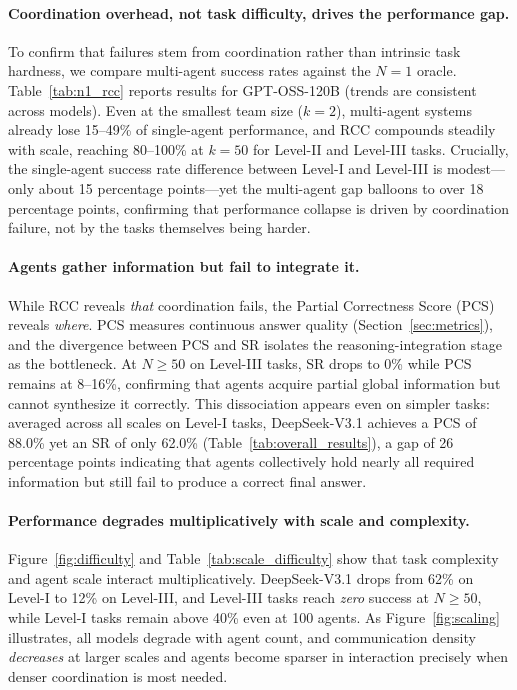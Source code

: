 \paragraph{Coordination overhead, not task difficulty, drives the performance gap.}
To confirm that failures stem from coordination rather than intrinsic task hardness, we compare multi-agent success rates against the $N{=}1$ oracle. 
Table~\ref{tab:n1_rcc} reports results for GPT-OSS-120B (trends are consistent across models). 
Even at the smallest team size ($k{=}2$), multi-agent systems already lose 15--49\% of single-agent performance, and RCC compounds steadily with scale, reaching 80--100\% at $k{=}50$ for Level-II and Level-III tasks. 
Crucially, the single-agent success rate difference between Level-I and Level-III is modest---only about 15 percentage points---yet the multi-agent gap balloons to over 18 percentage points, confirming that performance collapse is driven by coordination failure, not by the tasks themselves being harder.

\paragraph{Agents gather information but fail to integrate it.}
While RCC reveals \emph{that} coordination fails, the Partial Correctness Score (PCS) reveals \emph{where}. 
PCS measures continuous answer quality (Section~\ref{sec:metrics}), and the divergence between PCS and SR isolates the reasoning-integration stage as the bottleneck. 
At $N{\geq}50$ on Level-III tasks, SR drops to 0\% while PCS remains at 8--16\%, confirming that agents acquire partial global information but cannot synthesize it correctly.
This dissociation appears even on simpler tasks: averaged across all scales on Level-I tasks, DeepSeek-V3.1 achieves a PCS of 88.0\% yet an SR of only 62.0\% (Table~\ref{tab:overall_results}), a gap of 26 percentage points indicating that agents collectively hold nearly all required information but still fail to produce a correct final answer.

\paragraph{Performance degrades multiplicatively with scale and complexity.}
Figure~\ref{fig:difficulty} and Table~\ref{tab:scale_difficulty} show that task complexity and agent scale interact multiplicatively. DeepSeek-V3.1 drops from 62\% on Level-I to 12\% on Level-III, and Level-III tasks reach \emph{zero} success at $N{\geq}50$, while Level-I tasks remain above 40\% even at 100 agents. 
As Figure~\ref{fig:scaling} illustrates, all models degrade with agent count, and communication density \emph{decreases} at larger scales and agents become sparser in interaction precisely when denser coordination is most needed.

